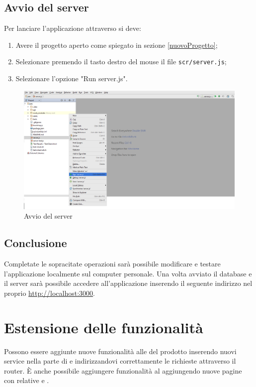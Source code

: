 \documentclass[12pt,a4paper]{article}
\begin{document}
	\subsection{Avvio del server}
	Per lanciare l'applicazione attraverso   si deve:
	\begin{enumerate}
		\item Avere il progetto aperto come spiegato in sezione \ref{nuovoProgetto};
		\item Selezionare premendo il tasto destro del mouse il file \texttt{scr/server.js};
		\item Selezionare l'opzione "Run server.js".
	\end{enumerate}
	\begin{center}
		\begin{figure}[H]
			\includegraphics[max width=\textwidth]{../img/manualeSviluppatore/runServer.png}
			\caption{Avvio del server}
		\end{figure}
	\end{center}
		
	\subsection{Conclusione}
	Completate le sopracitate operazioni sarà possibile modificare e testare l'applicazione localmente sul computer personale.
	Una volta avviato il database e il server  sarà possibile accedere all'applicazione inserendo il seguente indirizzo nel proprio  \url{http://localhost:3000}.
	
	\newpage
	\section{Estensione delle funzionalità}
	Possono essere aggiunte nuove funzionalità alle  del prodotto inserendo nuovi service nella parte di  e indirizzandovi correttamente le richieste attraverso il router. È anche possibile aggiungere funzionalità al  aggiungendo nuove pagine con relative  e .
\end{document}
